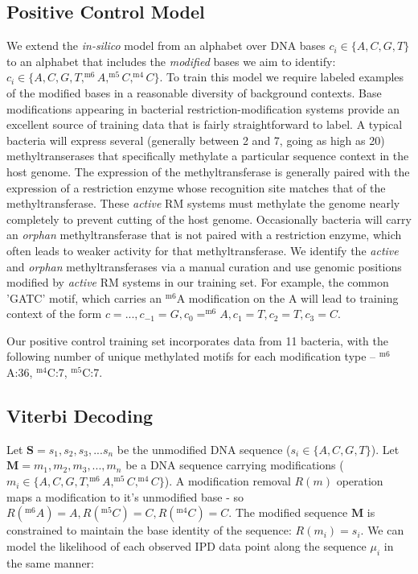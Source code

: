 \documentclass[pdftex]{article}
\newcommand{\mC}[1]{$^\textrm{m#1}$C}
\newcommand{\mA}{$^\textrm{m6}$A}
\begin{document}
\subsection { Positive Control Model }
We extend the \emph{in-silico} model from an alphabet over DNA bases $c_i \in \{A,C,G,T\}$ to an alphabet that includes the \emph{modified} bases we aim to identify: $c_i \in \{A,C,G,T, ^\textrm{m6}A, ^\textrm{m5}C, ^\textrm{m4}C \}$. To train this model we require labeled examples of the modified bases in a reasonable diversity of background contexts.  Base modifications appearing in bacterial restriction-modification systems provide an excellent source of training data that is fairly straightforward to label. A typical bacteria will express several (generally between 2 and 7, going as high as 20) methyltranserases that specifically methylate a particular sequence context in the host genome. The expression of the methyltransferase is generally paired with the expression of a restriction enzyme whose recognition site matches that of the methyltransferase. These \emph{active} RM systems must methylate the genome nearly completely to prevent cutting of the host genome. Occasionally bacteria will carry an \emph{orphan} methyltransferase that is not paired with a restriction enzyme, which often leads to weaker  activity for that methyltransferase. We identify the \emph{active} and \emph{orphan} methyltransferases via a manual curation and use genomic positions modified by \emph{active} RM systems in our training set. For example, the common 'GATC' motif, which carries an $^\textrm{m6}$A modification on the A will lead to training context of the form $c = { ..., c_{-1} = G, c_0 = ^\textrm{m6}A, c_1 = T, c_2 = T, c_3 = C }$.

Our positive control training set incorporates data from 11 bacteria, with the following number of unique methylated motifs for each modification type -- \mA:36, \mC{4}:7, \mC{5}:7.


\subsection{Viterbi Decoding}

Let $\mathbf{S} = s_1, s_2, s_3, ... s_n$ be the unmodified DNA sequence ($s_i \in \{A,C,G,T\}$). Let $\mathbf{M} = m_1, m_2, m_3, ..., m_n$ be a DNA sequence carrying modifications ($m_i \in \{A,C,G,T, ^\textrm{m6}A, ^\textrm{m5}C, ^\textrm{m4}C \}$). A modification removal $R(m)$ operation maps a modification to it's unmodified base - so $R(^\textrm{m6}A) = A, R(^\textrm{m5}C) = C, R(^\textrm{m4}C) = C$.  The modified sequence $\mathbf{M}$ is constrained to maintain the base identity of the sequence: $R(m_i) = s_i$.  We can model the likelihood of each observed IPD data point along the sequence $\mu_i$ in the same manner: 
\end{document}
